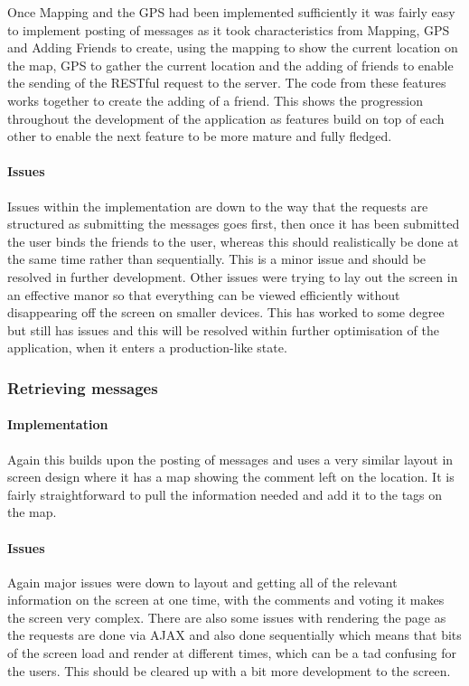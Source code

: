 Once Mapping and the GPS had been implemented sufficiently it was fairly easy to implement posting of messages as it took characteristics from Mapping, GPS and Adding Friends to create, using the mapping to show the current location on the map, GPS to gather the current location and the adding of friends to enable the sending of the RESTful request to the server. The code from these features works together to create the adding of a friend. This shows the progression throughout the development of the application as features build on top of each other to enable the next feature to be more mature and fully fledged.

\paragraph*{Issues}

Issues within the implementation are down to the way that the requests are structured as submitting the messages goes first, then once it has been submitted the user binds the friends to the user, whereas this should realistically be done at the same time rather than sequentially. This is a minor issue and should be resolved in further development. Other issues were trying to lay out the screen in an effective manor so that everything can be viewed efficiently without disappearing off the screen on smaller devices. This has worked to some degree but still has issues and this will be resolved within further optimisation of the application, when it enters a production-like state.

\subsubsection*{Retrieving messages}

\paragraph*{Implementation}

Again this builds upon the posting of messages and uses a very similar layout in screen design where it has a map showing the comment left on the location. It is fairly straightforward to pull the information needed and add it to the tags on the map. 

\paragraph*{Issues}

Again major issues were down to layout and getting all of the relevant information on the screen at one time, with the comments and voting it makes the screen very complex. There are also some issues with rendering the page as the requests are done via AJAX and also done sequentially which means that bits of the screen load and render at different times, which can be a tad confusing for the users. This should be cleared up with a bit more development to the screen.

